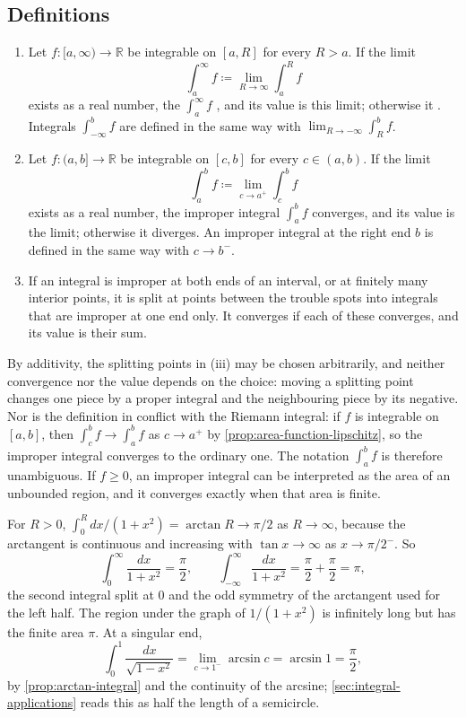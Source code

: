 \subsection{Definitions}

\begin{definition}
\label{def:improper}
\leavevmode
\begin{enumerate}
\item Let $f\colon[a,\infty)\to\mathbb R$ be integrable on $[a,R]$ for every $R>a$. If the limit
\[
\int_a^\infty f\coloneqq\lim_{R\to\infty}\int_a^Rf
\]
exists as a real number, the  $\int_a^\infty f$ , and its value is this limit; otherwise it . Integrals $\int_{-\infty}^bf$ are defined in the same way with $\lim_{R\to-\infty}\int_R^bf$.
\item Let $f\colon(a,b]\to\mathbb R$ be integrable on $[c,b]$ for every $c\in(a,b)$. If the limit
\[
\int_a^bf\coloneqq\lim_{c\to a^+}\int_c^bf
\]
exists as a real number, the improper integral $\int_a^bf$ converges, and its value is the limit; otherwise it diverges. An improper integral at the right end $b$ is defined in the same way with $c\to b^-$.
\item If an integral is improper at both ends of an interval, or at finitely many interior points, it is split at points between the trouble spots into integrals that are improper at one end only. It converges if each of these converges, and its value is their sum.
\end{enumerate}
\end{definition}

By additivity, the splitting points in (iii) may be chosen arbitrarily, and neither convergence nor the value depends on the choice: moving a splitting point changes one piece by a proper integral and the neighbouring piece by its negative. Nor is the definition in conflict with the Riemann integral: if $f$ is integrable on $[a,b]$, then $\int_c^bf\to\int_a^bf$ as $c\to a^+$ by \cref{prop:area-function-lipschitz}, so the improper integral converges to the ordinary one. The notation $\int_a^bf$ is therefore unambiguous. If $f\ge0$, an improper integral can be interpreted as the area of an unbounded region, and it converges exactly when that area is finite.

For $R>0$, $\int_0^Rdx/(1+x^2)=\arctan R\to\pi/2$ as $R\to\infty$, because the arctangent is continuous and increasing with $\tan x\to\infty$ as $x\to\pi/2^-$. So
\[
\int_0^\infty\frac{dx}{1+x^2}=\frac\pi2,\qquad\int_{-\infty}^\infty\frac{dx}{1+x^2}=\frac\pi2+\frac\pi2=\pi ,
\]
the second integral split at $0$ and the odd symmetry of the arctangent used for the left half. The region under the graph of $1/(1+x^2)$ is infinitely long but has the finite area $\pi$. At a singular end,
\[
\int_0^1\frac{dx}{\sqrt{1-x^2}}=\lim_{c\to1^-}\arcsin c=\arcsin1=\frac\pi2 ,
\]
by \cref{prop:arctan-integral} and the continuity of the arcsine; \cref{sec:integral-applications} reads this as half the length of a semicircle.

